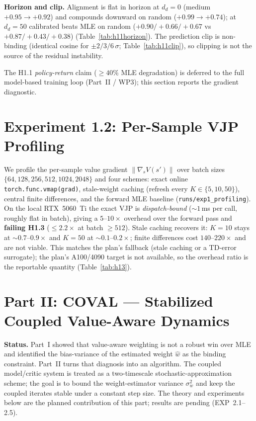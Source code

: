 \documentclass{article}
\theoremstyle{plain}
\begin{document}
\textbf{Horizon and clip.} Alignment is flat in horizon at $d_d = 0$ (medium
$+0.95 \to +0.92$) and compounds downward on random ($+0.99 \to +0.74$); at $d_d = 50$
calibrated beats MLE on random ($+0.90/+0.66/+0.67$ vs $+0.87/+0.43/+0.38$)
(Table~\ref{tab:h11horizon}). The prediction clip is non-binding (identical cosine for
$\pm 2/3/6\,\sigma$; Table~\ref{tab:h11clip}), so clipping is not the source of the
residual instability.

The H1.1 \emph{policy-return} claim ($\ge 40\%$ MLE degradation) is deferred to the full
model-based training loop (Part~II / WP3); this section reports the gradient diagnostic.

\section{Experiment 1.2: Per-Sample VJP Profiling}
\label{sec:exp12-profiling}

We profile the per-sample value gradient $\lVert \nabla_s V(s')\rVert$ over batch sizes
$\{64, 128, 256, 512, 1024, 2048\}$ and four schemes: exact online
\texttt{torch.func.vmap(grad)}, stale-weight caching (refresh every $K \in \{5, 10, 50\}$),
central finite differences, and the forward MLE baseline
(\texttt{runs/exp1\_profiling}). On the local RTX~5060~Ti the exact VJP is
\emph{dispatch-bound} ($\sim 1$\,ms per call, roughly flat in batch), giving a
$5$--$10\times$ overhead over the forward pass and \textbf{failing H1.3} ($\le 2.2\times$
at batch $\ge 512$). Stale caching recovers it: $K = 10$ stays at $\sim 0.7$--$0.9\times$
and $K = 50$ at $\sim 0.1$--$0.2\times$; finite differences cost $140$--$220\times$ and
are not viable. This matches the plan's fallback (stale caching or a TD-error surrogate);
the plan's A100/4090 target is not available, so the overhead ratio is the reportable
quantity (Table~\ref{tab:h13}).

\section{Part II: COVAL --- Stabilized Coupled Value-Aware Dynamics}
\label{sec:coval}

\textbf{Status.} Part~I showed that value-aware weighting is not a robust win over MLE and
identified the bias-variance of the estimated weight $\hat{w}$ as the binding constraint.
Part~II turns that diagnosis into an algorithm. The coupled model/critic system is treated
as a two-timescale stochastic-approximation scheme; the goal is to bound the
weight-estimator variance $\sigma_w^2$ and keep the coupled iterates stable under a
constant step size. The theory and experiments below are the planned contribution of this
part; results are pending (EXP~2.1--2.5).
\end{document}

